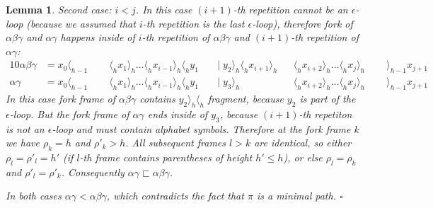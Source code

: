 \documentclass[AMA,STIX1COL]{WileyNJD-v2}
\newcommand{\Xl}{\langle}
\newcommand{\Xr}{\rangle}
\newtheorem{XLem}{Lemma}
\begin{document}
\begin{XLem}
    Second case: $i < j$.
    In this case $(i + 1)$-th repetition cannot be an $\epsilon$-loop
    (because we assumed that $i$-th repetition is the \emph{last} $\epsilon$-loop),
    therefore
    fork of $\alpha \beta \gamma$ and $\alpha \gamma$ happens
    inside of $i$-th repetition of $\alpha \beta \gamma$
    and $(i + 1)$-th repetition of $\alpha \gamma$:
    \begin{alignat*}{10}
        \alpha \beta \gamma &= x_0 \Xl_{h-1} \;&&\; \Xl_h x_1 \Xr_h \hdots \Xl_h x_{i-1} \Xr_h \Xl_h y_1 \;&&\big|\; y_2 \Xr_h \Xl_h x_{i+1} \Xr_h && \Xl_h x_{i+2} \Xr_h \hdots \Xl_h x_j \Xr_h \;&&\; \Xr_{h-1} x_{j+1} \\[-0.5em]
        \alpha \gamma       &= x_0 \Xl_{h-1} \;&&\; \Xl_h x_1 \Xr_h \hdots \Xl_h x_{i-1} \Xr_h \Xl_h y_1 \;&&\big|\; y_3 \Xr_h                     && \Xl_h x_{i+2} \Xr_h \hdots \Xl_h x_j \Xr_h \;&&\; \Xr_{h-1} x_{j+1}
    \end{alignat*}
    In this case
    fork frame of $\alpha \beta \gamma$ contains $y_2 \Xr_h \Xl_h$ fragment, because $y_2$ is part of the $\epsilon$-loop.
    But the fork frame of $\alpha \gamma$ ends inside of $y_3$, because $(i+1)$-th repetiton is not an $\epsilon$-loop and must contain alphabet symbols.
    Therefore at the fork frame $k$ we have $\rho_k = h$ and $\rho'_k > h$.
    All subsequent frames $l > k$ are identical,
    so either $\rho_l = \rho'_l = h'$ (if $l$-th frame contains parentheses of height $h' \leq h$),
    or else $\rho_l = \rho_k$ and $\rho'_l = \rho'_k$.
    Consequently $\alpha \gamma \sqsubset \alpha \beta \gamma$.

    In both cases $\alpha \gamma < \alpha \beta \gamma$,
    which contradicts the fact that $\pi$ is a minimal path.
    $\square$
    \end{XLem}
\end{document}
